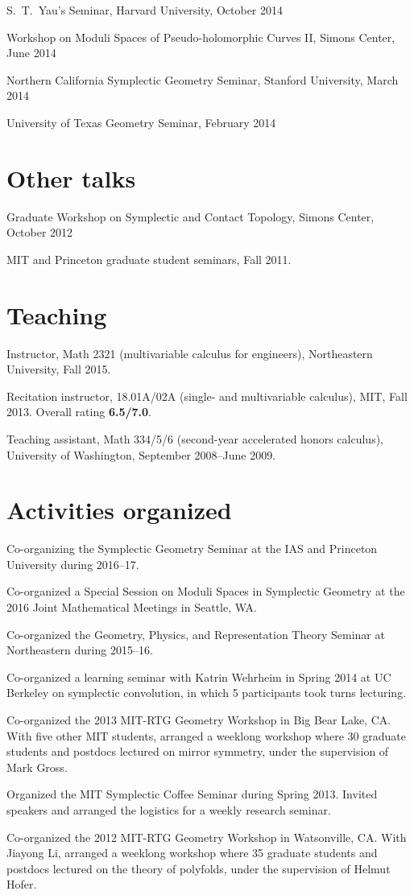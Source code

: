 \documentclass[margin,line]{res}
\begin{document}
\begin{resume}
S.\ T.\ Yau's Seminar, Harvard University, October 2014

Workshop on Moduli Spaces of Pseudo-holomorphic Curves II, Simons Center, June 2014

Northern California Symplectic Geometry Seminar, Stanford University, March 2014

University of Texas Geometry Seminar, February 2014

\section{\sc Other talks}

Graduate Workshop on Symplectic and Contact Topology, Simons Center, October 2012

MIT and Princeton graduate student seminars, Fall 2011.

\section{\sc Teaching}

Instructor, Math 2321 (multivariable calculus for engineers), Northeastern University, Fall 2015.

Recitation instructor, 18.01A/02A (single- and multivariable calculus), MIT, Fall 2013.  Overall rating {\bf 6.5/7.0}.

Teaching assistant, Math 334/5/6 (second-year accelerated honors calculus), University of Washington, September 2008--June 2009.

\section{\sc Activities organized}
Co-organizing the Symplectic Geometry Seminar at the IAS and Princeton University during 2016--17.

Co-organized a Special Session on Moduli Spaces in Symplectic Geometry at the 2016 Joint Mathematical Meetings in Seattle, WA.

Co-organized the Geometry, Physics, and Representation Theory Seminar at Northeastern during 2015--16.

Co-organized a learning seminar with Katrin Wehrheim in Spring 2014 at UC Berkeley on symplectic convolution, in which 5 participants took turns lecturing.

Co-organized the 2013 MIT-RTG Geometry Workshop in Big Bear Lake, CA.  With five other MIT students, arranged a weeklong workshop where 30 graduate students and postdocs lectured on mirror symmetry, under the supervision of Mark Gross.

Organized the MIT Symplectic Coffee Seminar during Spring 2013.  Invited speakers and arranged the logistics for a weekly research seminar.

Co-organized the 2012 MIT-RTG Geometry Workshop in Watsonville, CA.  With Jiayong Li, arranged a weeklong workshop where 35 graduate students and postdocs lectured on the theory of polyfolds, under the supervision of Helmut Hofer.

\end{resume}
\end{document}

